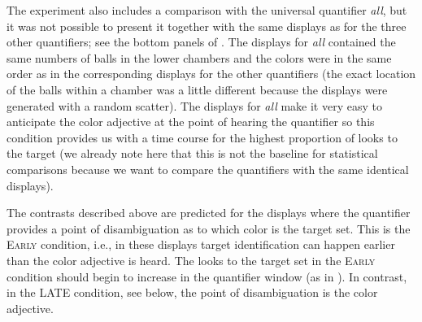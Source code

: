 \documentclass[output=paper]{langscibook}
\begin{document}
%



The experiment also includes a comparison with the universal quantifier \textit{all}, but it was not possible to present it together with the same displays as for the three other quantifiers; see the bottom panels of . The displays for \textit{all} contained the same numbers of balls in the lower chambers and the colors were in the same order as in the corresponding displays for the other quantifiers (the exact location of the balls within a chamber was a little different because the displays were generated with a random scatter). The displays for \textit{all} make it very easy to anticipate the color adjective at the point of hearing the quantifier so this condition provides us with a time course for the highest proportion of looks to the target (we already note here that this is not the baseline for statistical comparisons because we want to compare the quantifiers with the same identical displays).

The contrasts described above are predicted for the displays where the quantifier provides a point of disambiguation as to which color is the target set. This is the \textsc{Early} condition, i.e., in these displays target identification can happen earlier
than the color adjective is heard. The looks to the target set in the \textsc{Early} condition should begin to increase in the quantifier window (as in \citealt{degen2016availability}). In contrast, in the LATE condition, see  below, the point of disambiguation is the color adjective.
\end{document}
